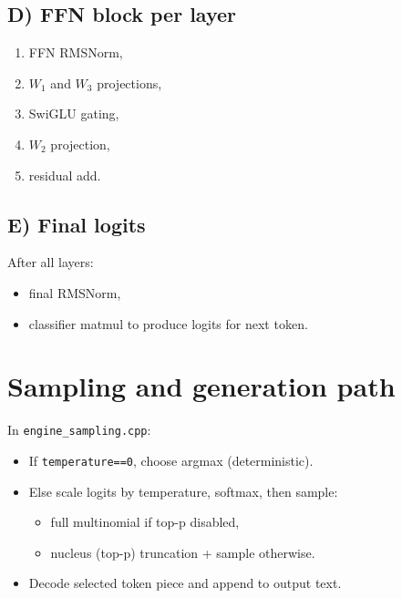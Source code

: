 \documentclass[11pt]{article}
\begin{document}
\subsection{D) FFN block per layer}
\begin{enumerate}[leftmargin=*]
  \item FFN RMSNorm,
  \item \(W_1\) and \(W_3\) projections,
  \item SwiGLU gating,
  \item \(W_2\) projection,
  \item residual add.
\end{enumerate}

\subsection{E) Final logits}
After all layers:
\begin{itemize}[leftmargin=*]
  \item final RMSNorm,
  \item classifier matmul to produce logits for next token.
\end{itemize}

\section{Sampling and generation path}
In \texttt{engine\_sampling.cpp}:
\begin{itemize}[leftmargin=*]
  \item If \texttt{temperature==0}, choose argmax (deterministic).
  \item Else scale logits by temperature, softmax, then sample:
  \begin{itemize}
    \item full multinomial if top-p disabled,
    \item nucleus (top-p) truncation + sample otherwise.
  \end{itemize}
  \item Decode selected token piece and append to output text.
\end{itemize}
\end{document}
